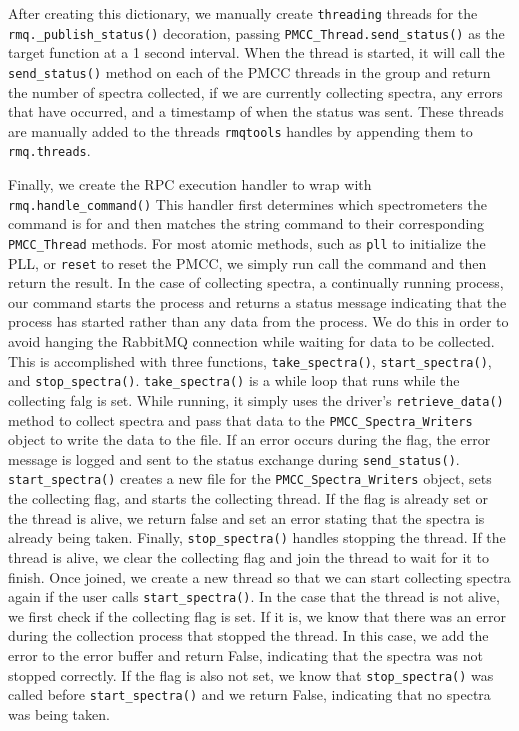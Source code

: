 After creating this dictionary, we manually create \texttt{threading} threads for the \texttt{rmq.\_publish\_status()} decoration, passing \texttt{PMCC\_Thread.send\_status()} as the target function at a 1 second interval. 
When the thread is started, it will call the \texttt{send\_status()} method on each of the PMCC threads in the group and return the number of spectra collected, if we are currently collecting spectra, any errors that have occurred, and a timestamp of when the status was sent.
These threads are manually added to the threads \texttt{rmqtools} handles by appending them to \texttt{rmq.threads}.

Finally, we create the RPC execution handler to wrap with \texttt{rmq.handle\_command()}
This handler first determines which spectrometers the command is for and then matches the string command to their corresponding \texttt{PMCC\_Thread} methods.
For most atomic methods, such as \texttt{pll} to initialize the PLL, or \texttt{reset} to reset the PMCC, we simply run call the command and then return the result. 
In the case of collecting spectra, a continually running process, our command starts the process and returns a status message indicating that the process has started rather than any data from the process. 
We do this in order to avoid hanging the RabbitMQ connection while waiting for data to be collected.
This is accomplished with three functions, \texttt{take\_spectra()}, \texttt{start\_spectra()}, and \texttt{stop\_spectra()}.
\texttt{take\_spectra()} is a while loop that runs while the collecting falg is set. 
While running, it simply uses the driver's \texttt{retrieve\_data()} method to collect spectra and pass that data to the \texttt{PMCC\_Spectra\_Writers} object to write the data to the file.
If an error occurs during the flag, the error message is logged and sent to the status exchange during \texttt{send\_status()}.
\texttt{start\_spectra()} creates a new file for the \texttt{PMCC\_Spectra\_Writers} object, sets the collecting flag, and starts the collecting thread.
If the flag is already set or the thread is alive, we return false and set an error stating that the spectra is already being taken.
Finally, \texttt{stop\_spectra()} handles stopping the thread.
If the thread is alive, we clear the collecting flag and join the thread to wait for it to finish.
Once joined, we create a new thread so that we can start collecting spectra again if the user calls \texttt{start\_spectra()}.
In the case that the thread is not alive, we first check if the collecting flag is set.
If it is, we know that there was an error during the collection process that stopped the thread.
In this case, we add the error to the error buffer and return False, indicating that the spectra was not stopped correctly.
If the flag is also not set, we know that \texttt{stop\_spectra()} was called before \texttt{start\_spectra()} and we return False, indicating that no spectra was being taken.

